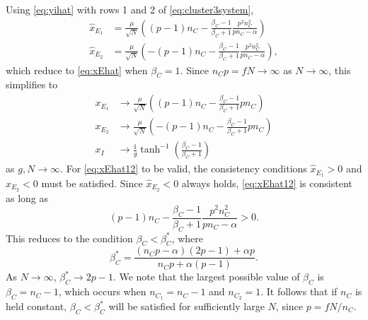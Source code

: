 \documentclass[reqno]{siamonline190516}
\begin{document}
Using \cref{eq:yihat} with rows 1 and 2 of \cref{eq:cluster3system},
\begin{equation}\label{eq:xEhat12}
\begin{aligned}
    \hat{x}_{E_1} &= \frac{\mu}{\sqrt{N}}\left( (p-1)n_C - \frac{\beta_C - 1}{\beta_C+1} \frac{p^2 n_C^2}{p n_C - \alpha} \right) \\
    \hat{x}_{E_2} &= \frac{\mu}{\sqrt{N}}\left( -(p-1)n_C - \frac{\beta_C - 1}{\beta_C+1} \frac{p^2 n_C^2}{p n_C - \alpha} \right),
\end{aligned}
\end{equation}
which reduce to \cref{eq:xEhat} when $\beta_C = 1$. Since $n_C p = f N \rightarrow \infty$ as $N \rightarrow \infty$, this simplifies to
\begin{equation}\label{eq:xEhat12IlargeN}
    \begin{aligned}
        x_{E_1} &\rightarrow\frac{\mu}{\sqrt{N}}\left( (p-1)n_C - \frac{\beta_C - 1}{\beta_C+1} p n_C \right) \\
        x_{E_2} &\rightarrow \frac{\mu}{\sqrt{N}}\left( -(p-1)n_C - \frac{\beta_C - 1}{\beta_C+1} p n_C \right) \\
        x_I &\rightarrow \frac{1}{g}\tanh^{-1}\left( \frac{\beta_C - 1}{\beta_C+1} \right)
    \end{aligned}
\end{equation}
as $g, N \rightarrow \infty$. For \cref{eq:xEhat12} to be valid, the consistency conditions $\hat{x}_{E_1} > 0$ and $\hat{x}_{E_2} < 0$ must be satisfied. Since $\hat{x}_{E_2} < 0$ always holds, \cref{eq:xEhat12} is consistent as long as
\[
(p-1)n_C - \frac{\beta_C - 1}{\beta_C+1}\frac{p^2 n_C^2}{p n_C - \alpha}  > 0.
\] 
This reduces to the condition $\beta_C < \beta_C^*$, where
\begin{equation}\label{eq:betaCstar}
    \beta_C^* = \frac{(n_C p - \alpha )(2 p - 1) + \alpha p}{n_C p + \alpha(p-1)}.
\end{equation}
As $N \rightarrow \infty$, $\beta_C^* \rightarrow 2 p-1$. We note that the largest possible value of $\beta_C$ is $\beta_C = n_C - 1$, which occurs when $n_{C_1} = n_C - 1$ and $n_{C_2} = 1$. It follows that if $n_C$ is held constant, $\beta_C < \beta_C^*$ will be satisfied for sufficiently large $N$, since $p = f N/n_C$.
\end{document}
